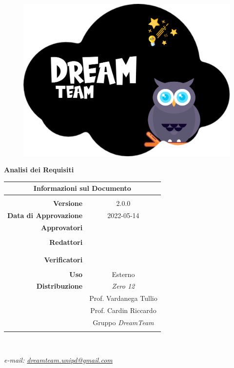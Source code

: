 
\begin{center}
\begin{figure}
\centering
\includegraphics[scale=0.05]{Sezioni/images/DreamTeam.png} 
\end{figure}

{\Huge{\textbf{Analisi dei Requisiti}}} \\ [1cm]

\begin{table}[htbp]
\centering
\begin{tabular}{r|c}
\multicolumn{2}{c}{\textbf{Informazioni sul Documento}} \\
\hline \\
\textbf{Versione} & 2.0.0 \\ \rule{0pt}{3ex}   
\textbf{Data di Approvazione} & 2022-05-14 \\ \rule{0pt}{3ex}    
\textbf{Approvatori} & \EP{} \\ \rule{0pt}{2ex}   
& \MG{} \\ \rule{0pt}{3ex}  
\textbf{Redattori} & \FP{} \\ \rule{0pt}{2ex}   
& \GC{} \\ \rule{0pt}{2ex}    
& \LW{} \\ \rule{0pt}{3ex}    
\textbf{Verificatori} & \PV{} \\ \rule{0pt}{2ex}     
& \MG{} \\ \rule{0pt}{3ex}      
\textbf{Uso} & Esterno \\ \rule{0pt}{3ex}    
\textbf{Distribuzione} & \textit{Zero 12} \\ \rule{0pt}{2ex} 
& Prof. Vardanega Tullio \\ \rule{0pt}{2ex}   
& Prof. Cardin Riccardo \\ \rule{0pt}{2ex}   
& Gruppo \textit{DreamTeam} \\ \rule{0pt}{0.1cm}   
\end{tabular} \\ [0.5cm]
\end{table}

\textsl{ e-mail: \href{mailto:dreamteam.unipd@gmail.com}{dreamteam.unipd@gmail.com} } \\[2cm]
\end{center}
\pagebreak